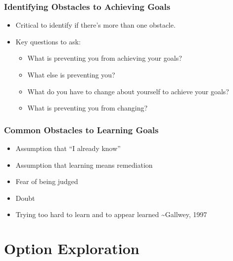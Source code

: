 \documentclass[
]{book}
\providecommand{\tightlist}{%
  \setlength{\itemsep}{0pt}\setlength{\parskip}{0pt}}
\begin{document}
\hypertarget{identifying-obstacles-to-achieving-goals}{%
\subsubsection*{Identifying Obstacles to Achieving Goals}\label{identifying-obstacles-to-achieving-goals}}

\begin{itemize}
\tightlist
\item
  Critical to identify if there's more than one obstacle.
\item
  Key questions to ask:

  \begin{itemize}
  \tightlist
  \item
    What is preventing you from achieving your goals?
  \item
    What else is preventing you?
  \item
    What do you have to change about yourself to achieve your goals?
  \item
    What is preventing you from changing?
  \end{itemize}
\end{itemize}

\hypertarget{common-obstacles-to-learning-goals}{%
\subsubsection*{Common Obstacles to Learning Goals}\label{common-obstacles-to-learning-goals}}

\begin{itemize}
\tightlist
\item
  Assumption that ``I already know''
\item
  Assumption that learning means remediation
\item
  Fear of being judged
\item
  Doubt
\item
  Trying too hard to learn and to appear learned
  \textasciitilde Gallwey, 1997
\end{itemize}

\hypertarget{option-exploration}{%
\section*{Option Exploration}\label{option-exploration}}
\end{document}
